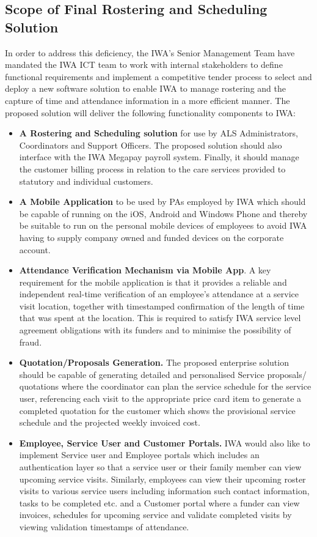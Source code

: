 \documentclass[a4paper,12pt]{article}
\begin{document}
\begin{samepage}
\subsection {Scope of Final Rostering and Scheduling Solution}
In order to address this deficiency, the IWA's Senior Management Team have mandated the IWA ICT team to work with internal stakeholders to define functional requirements and implement a competitive tender process to select and deploy a new software solution to enable IWA to manage rostering and the capture of time and attendance information in a more efficient manner.
The proposed solution will deliver the following functionality components to IWA:
\begin{itemize}
\item \textbf{A Rostering and Scheduling solution} for use by ALS Administrators, Coordinators and Support Officers. The proposed solution should also interface with the IWA Megapay payroll system. Finally, it should manage the customer billing process in relation to the care services provided to statutory and individual customers.
\item \textbf {A Mobile Application} to be used by PAs employed by IWA which should be capable of running on the iOS, Android and Windows Phone and thereby be suitable to run on the personal mobile devices of employees to avoid IWA having to supply company owned and funded devices on the corporate account. 
\item \textbf {Attendance Verification Mechanism via Mobile App}. A key requirement for the mobile application is that it provides a reliable and independent real-time verification of an employee’s attendance at a service visit location, together with timestamped confirmation of the length of time that was spent at the location.  This is required to satisfy IWA service level agreement obligations with its funders and to minimise the possibility of fraud.
\pagebreak
\item\textbf {Quotation/Proposals Generation.} The proposed enterprise solution should be capable of generating detailed and personalised Service proposals/ quotations where the coordinator can plan the service schedule for the service user, referencing each visit to the appropriate price card item to generate a completed quotation for the customer which shows the provisional service schedule and the projected weekly invoiced cost.
\item \textbf {Employee, Service User and Customer Portals.} IWA would also like to implement Service user and Employee portals which includes an authentication layer so that a service user or their family member can view upcoming service visits. Similarly, employees can view their upcoming roster visits to various service users including information such contact information, tasks to be completed etc. and a Customer portal where a funder can view invoices, schedules for upcoming service and validate completed visits by viewing validation timestamps of attendance.
\end{itemize}

\end{samepage}
\end{document}
